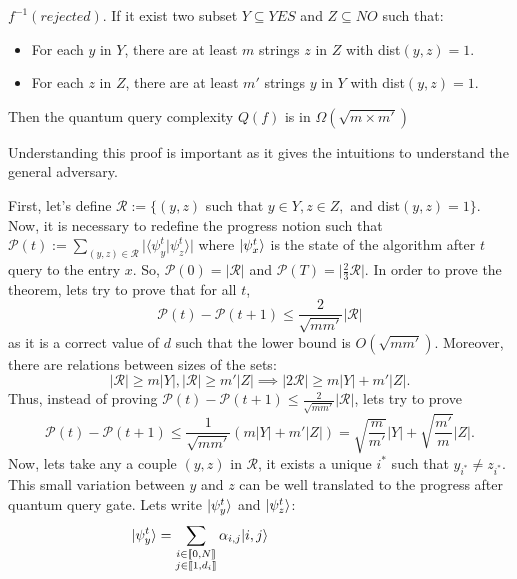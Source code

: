 \begin{appendix}
\begin{theorem}
        $f^{-1}(rejected)$. If it exist two subset $Y\subseteq YES$ and
        $Z \subseteq NO$ such that:
        \begin{itemize}
            \item For each $y$ in $Y$, there are at least $m$ strings $z$ in $Z$ with dist$(y,z)=1$.
            \item For each $z$ in $Z$, there are at least $m'$ strings $y$ in $Y$ with dist$(y,z)=1$.
        \end{itemize}
        Then the quantum query complexity $Q(f)$ is in  $\Omega(\sqrt{m\times m'})$
    \end{theorem}

    Understanding this proof is important as it gives the intuitions to understand the
    general adversary.

    \begin{tproof}
        First, let's define $\mathcal{R}:= \{(y, z)$ such that $ y \in Y, z \in Z,$ and dist$(y,z)=1\}$.
        Now, it is necessary to redefine the progress notion such that
        $\mathcal{P}(t) := \sum_{(y,z) \in \mathcal{R}}\vert \langle \psi^t_y \vert \psi^t_z \rangle\vert$
        where $|\psi_x^t\rangle$ is the state of the algorithm after $t$ query to the entry $x$.
        So, $\mathcal{P}(0) = \vert \mathcal{R} \vert$ and $\mathcal{P}(T) = \vert \frac{2}{3}\mathcal{R} \vert$.
        In order to prove the theorem, lets try to prove that for all $t$,
        \[\mathcal{P}(t) - \mathcal{P}(t+1) \leq \frac{2}{\sqrt{m m'}}\vert \mathcal{R}\vert\]
        as it is a correct value
        of $d$ such that the lower bound is $O(\sqrt{mm'})$. Moreover, there are relations between sizes
        of the sets:
        \[\vert \mathcal{R} \vert \geq m \vert Y \vert, \vert \mathcal{R} \vert \geq m' \vert Z \vert
            \implies \vert 2\mathcal{R} \vert \geq m \vert Y \vert+ m' \vert Z \vert.\] Thus, instead of proving
        $\mathcal{P}(t) - \mathcal{P}(t+1) \leq \frac{2}{\sqrt{m m'}}\vert \mathcal{R}\vert$, lets try
        to prove
        \[\mathcal{P}(t) - \mathcal{P}(t+1) \leq \frac{1}{\sqrt{m m'}}(m \vert Y \vert+ m' \vert Z \vert)
            = \sqrt{\frac{m}{m'}} \vert Y \vert + \sqrt{\frac{m'}{m}}\vert Z \vert.\]
        Now, lets take any a couple $(y,z)$ in $\mathcal{R}$, it exists a unique $i^*$ such that $y_{i^*} \neq z_{i^*}$.
        This small variation between $y$ and $z$ can be well translated to the progress after quantum query gate.
        Lets write $|\psi^{t}_y\rangle$ and $|\psi^{t}_z\rangle$: \\
        \[\ket{\psi^{t}_y} = \sum_{\substack{i \in \llbracket0,N\rrbracket\\j \in \llbracket1, d_i\rrbracket}}\alpha_{i,j} \ket{i,j} \hspace*{3cm }
\]
\end{tproof}
\end{appendix}
